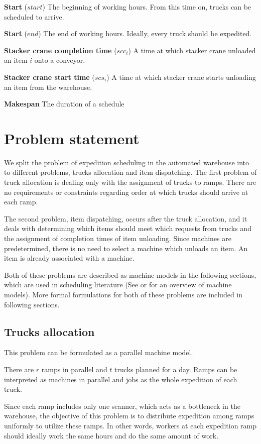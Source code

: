\documentclass{ctuthesis}
\begin{document}
\noindent \textbf{Start} ($start$) The beginning of working hours. From this time on, trucks can be scheduled to arrive.

\noindent \textbf{Start} ($end$) The end of working hours. Ideally, every truck should be expedited.

\noindent \textbf{Stacker crane completion time} ($scc_i$) A time at which stacker crane unloaded an item $i$ onto a conveyor.

\noindent \textbf{Stacker crane start time} ($scs_i$) A time at which stacker crane starts unloading an item from the warehouse.

\noindent \textbf{Makespan} The duration of a schedule

\chapter{Problem statement}

 We split the problem of expedition scheduling in the automated warehouse into to different problems, trucks allocation and item dispatching. The first problem of truck allocation is dealing only with the assignment of trucks to ramps. There are no requirements or constraints regarding order at which trucks should arrive at each ramp.
 
 The second problem, item dispatching, occurs after the truck allocation, and it deals with determining which items should meet which requests from trucks and the assignment of completion times of item unloading. Since machines are predetermined, there is no need to select a machine which unloads an item. An item is already associated with a machine.
 
Both of these problems are described as machine models in the following sections, which are used in scheduling literature (See \cite{pinedo} or \cite{bucker} for an overview of machine models). More formal formulations for both of these problems are included in following sections.
 
 \section{Trucks allocation}
 \label{subsec:truckallocation}
This problem can be formulated as a parallel machine model.
 
 There are $r$ ramps in parallel and $t$ trucks planned for a day. Ramps can be interpreted as machines in parallel and jobs as the whole expedition of each truck. 
 
 Since each ramp includes only one scanner, which acts as a bottleneck in the warehouse, the objective of this problem is to distribute expedition among ramps uniformly to utilize these ramps. In other words, workers at each expedition ramp should ideally work the same hours and do the same amount of work. 
 
\end{document}
